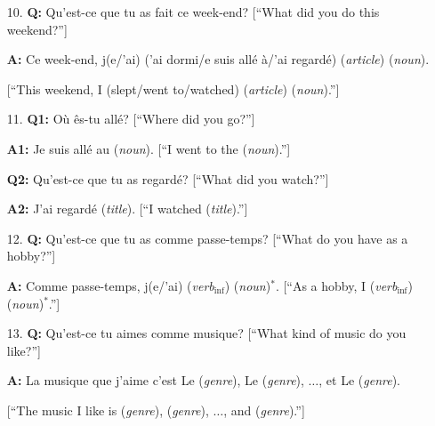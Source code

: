 \documentclass{article}
\theoremstyle{definition}
\theoremstyle{remark}
\theoremstyle{definition}
\begin{document}
    \vspace{4mm}
    
    \begin{enumerate}[leftmargin=*]
        \item[10.]\textbf{Q:} Qu'est-ce que tu as fait ce week-end? [``What did you do this weekend?'']\par 
            \noindent\textbf{A:} Ce week-end, j(e/'ai) ('ai dormi/e suis all\'e \`a/'ai regard\'e) (\textit{article}) (\textit{noun}). \par\hspace{5.5mm}[``This weekend, I (slept/went to/watched) (\textit{article}) (\textit{noun}).'']\par \vspace{3mm}
            \hline
            
        \item[11.]\textbf{Q1:} O\`u \^es-tu all\'e? [``Where did you go?'']\par 
            \noindent\textbf{A1:} Je suis all\'e au (\textit{noun}). [``I went to the (\textit{noun}).'']\par 
            \noindent\textbf{Q2:} Qu'est-ce que tu as regard\'e? [``What did you watch?'']\par 
            \noindent\textbf{A2:} J'ai regard\'e (\textit{title}). [``I watched (\textit{title}).'']\par \vspace{3mm}
            \hline
            
        \item[12.]\textbf{Q:} Qu'est-ce que tu as comme passe-temps? [``What do you have as a hobby?'']\par 
            \noindent\textbf{A:} Comme passe-temps, j(e/'ai) (\textit{verb$_{\text{inf}}$}) (\textit{noun})$^*$. [``As a hobby, I (\textit{verb$_{\text{inf}}$}) (\textit{noun})$^*$.'']\par \vspace{3mm}
            \hline
            
        \item[13.]\textbf{Q:} Qu'est-ce tu aimes comme musique? [``What kind of music do you like?'']\par 
            \noindent\textbf{A:} La musique que j'aime c'est Le (\textit{genre}), Le (\textit{genre}), $\dots$, et Le (\textit{genre}).\par\hspace{4.5mm}
            [``The music I like is (\textit{genre}), (\textit{genre}), $\dots$, and (\textit{genre}).'']\par \vspace{3mm}
            \hline
            

\end{enumerate}
\end{document}
